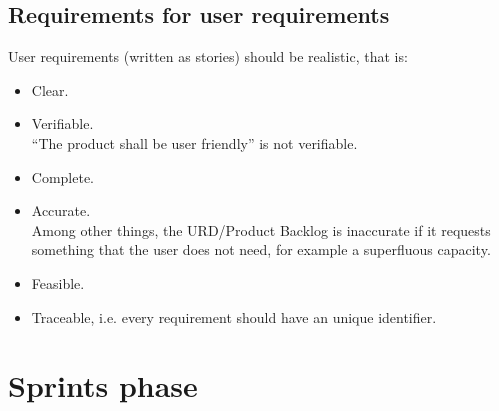 \documentclass[%
		pathtobase=..,%
		titlefull={Software Validation and Verification Plan},%
		titleabbr=SVVP,%
		version=0.1]{fingerpaint}
\begin{document}
\section{Requirements for user requirements}
User requirements (written as stories) should be realistic, that is:
\begin{itemize}
\item Clear.
\item Verifiable.\\
	``The product shall be user friendly'' is not verifiable.
\item Complete.
\item Accurate.\\
          Among other things, the URD/Product Backlog is inaccurate if it requests something that the user does not
          need, for example a superfluous capacity.
\item Feasible.
\item Traceable, i.e. every requirement should have an unique identifier.
\end{itemize}

\chapter{Sprints phase} \label{Sprints phase}
\end{document}
